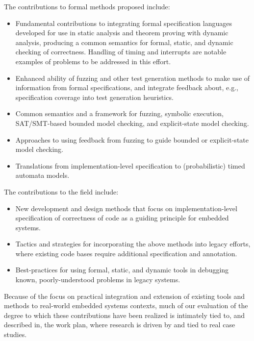 The contributions to formal methods proposed include:

\begin{itemize}
\item Fundamental contributions to integrating formal specification
languages developed for use in static analysis and theorem proving
with dynamic analysis, producing a common semantics for formal,
static, and dynamic checking of correctness.  Handling of timing and
interrupts are notable examples of problems to be addressed in this effort.
\item Enhanced ability of fuzzing and other test generation methods to
make use of information from formal specifications, and integrate
feedback about, e.g., specification coverage into test generation
heuristics.
\item Common semantics and a framework for fuzzing, symbolic execution, SAT/SMT-based
bounded model checking, and explicit-state model checking.
\item Approaches to using feedback from fuzzing to guide bounded or explicit-state model
checking.
\item Translations from implementation-level specification to
(probabilistic) timed automata models.
\end{itemize}

The contributions to the field include:

\begin{itemize}
\item New development and design methods that focus on
implementation-level specification of correctness of code as a guiding
principle for embedded systems.
\item Tactics and strategies for incorporating the above methods into
legacy efforts, where existing code bases require additional
specification and annotation.
\item Best-practices for using formal, static, and dynamic tools in
debugging known, poorly-understood problems in legacy systems.
\end{itemize}


Because of the focus on practical integration and extension of
existing tools and methods to real-world embedded systems contexts,
much of our evaluation of the degree to which these contributions have
been realized is intimately tied to, and described in, the work plan, where
research is driven by and tied to real case studies.